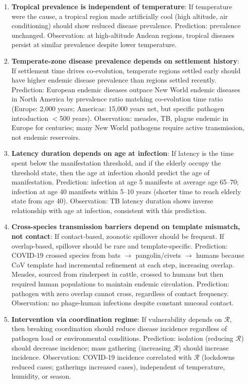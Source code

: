 \documentclass[11pt,twocolumn,a4paper]{article}
\newcommand{\Coord}{\mathcal{R}}
\begin{document}
\begin{enumerate}[label=P\arabic*.]
\item \textbf{Tropical prevalence is independent of temperature}: If temperature were the cause, a tropical region made artificially cool (high altitude, air conditioning) should show reduced disease prevalence. Prediction: prevalence unchanged. Observation: at high-altitude Andean regions, tropical diseases persist at similar prevalence despite lower temperature.

\item \textbf{Temperate-zone disease prevalence depends on settlement history}: If settlement time drives co-evolution, temperate regions settled early should have higher endemic disease prevalence than regions settled recently. Prediction: European endemic diseases outpace New World endemic diseases in North America by prevalence ratio matching co-evolution time ratio (Europe: 2,000 years; Americas: 15,000 years net, but specific pathogen introduction $<$500 years). Observation: measles, TB, plague endemic in Europe for centuries; many New World pathogens require active transmission, not endemic reservoirs.

\item \textbf{Latency duration depends on age at infection}: If latency is the time spent below the manifestation threshold, and if the elderly occupy the threshold state, then the age at infection should predict the age of manifestation. Prediction: infection at age 5 manifests at average age 65--70; infection at age 40 manifests within 5--10 years (shorter time to reach elderly state from age 40). Observation: TB latency duration shows inverse relationship with age at infection, consistent with this prediction.

\item \textbf{Cross-species transmission barriers depend on template mismatch, not contact}: If contact-based, zoonotic spillover should be frequent. If overlap-based, spillover should be rare and template-specific. Prediction: COVID-19 crossed species from bats $\to$ pangolin/civets $\to$ humans because CoV template had incremental refinement at each step, increasing overlap. Measles, sourced from rinderpest in cattle, crossed to humans but then required human populations to maintain endemic circulation. Prediction: pathogen with zero overlap cannot cross, regardless of contact frequency. Observation: no phage-human infections despite constant mucosal contact.

\item \textbf{Intervention via coordination regime}: If vulnerability depends on $\Coord$, then breaking coordination should reduce disease incidence regardless of pathogen load or environmental conditions. Prediction: isolation (reducing $\Coord$) should decrease incidence; mass gathering (increasing $\Coord$) should increase incidence. Observation: COVID-19 incidence correlated with $\Coord$ (lockdowns reduced cases; gatherings increased cases), independent of temperature, humidity, or season.
\end{enumerate}
\end{document}
